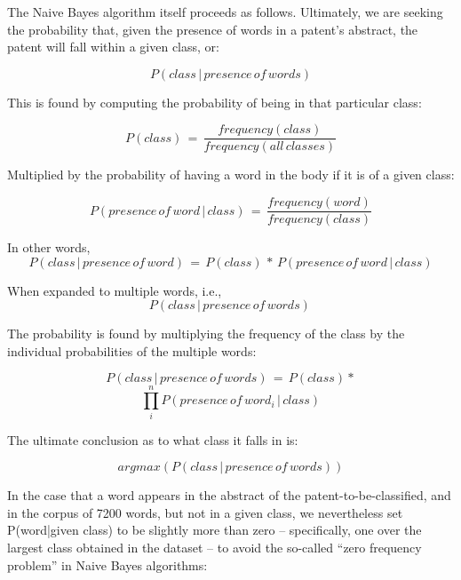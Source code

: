 \documentclass{article}
\begin{document}
The Naive Bayes algorithm itself proceeds as follows.  Ultimately, we are seeking the probability that, given the presence of words in a patent’s abstract, the patent will fall within a given class, or:

\begin{equation}
P(class\, |\, presence\, of\, words)
\end{equation}

This is found by computing the probability of being in that particular class:

\begin{equation}
P(class)\, =\,  \frac{frequency(class)}{frequency(all\, classes)}
\end{equation}


Multiplied by the probability of having a word in the body if it is of a given class:

\begin{equation}
P(presence\, of\, word\, |\, class)\, =\, \frac{frequency(word)}{frequency(class)}
\end{equation}


In other words,
\begin{equation}
P(class\, |\, presence\, of\, word)\, =\, P(class)\, *\, P(presence\, of\, word\, |\, class)
\end{equation}

When expanded to multiple words, i.e.,
\begin{equation}
P(class\, |\, presence\, of\, words)\, 
\end{equation}

The probability is found by multiplying the frequency of the class by the individual probabilities of the multiple words:

\begin{equation}
P(class\, |\, presence\, of\, words)\, =\, P(class)*
\end{equation}
 \[ \prod_{i}^{n}P(presence\, of\, word_i\, |\, class) \]
 
  The ultimate conclusion as to what class it falls in is:
  
\begin{equation}
argmax(P(class\, |\, presence\, of\, words))
\end{equation}

In the case that a word appears in the abstract of the patent-to-be-classified, and in the corpus of 7200 words, but not in a given class, we nevertheless set P(word|given class) to be slightly more than zero – specifically, one over the largest class obtained in the dataset – to avoid the so-called “zero frequency problem” in Naive Bayes algorithms:
\end{document}
